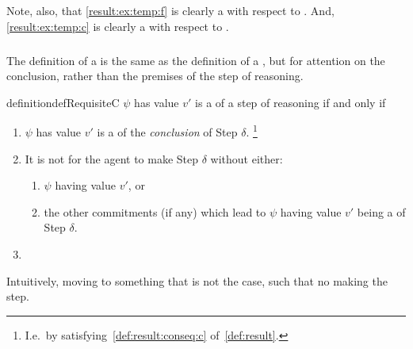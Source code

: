 \begin{note}
  Note, also, that \ref{result:ex:temp:f} is clearly a  with respect to \CStepB{}.
  And, \ref{result:ex:temp:c} is clearly a \prequ{} with respect to \CStepC{}.
\end{note}

\subparagraph{}

\begin{note}
  The definition of a  is the same as the definition of a , but for attention on the conclusion, rather than the premises of the step of reasoning.
\end{note}

\begin{note}
  \begin{restatable}{definition}{defRequisiteC}
    \label{def:crequ}
    \(\psi\) has value \(v'\) is a \emph{} of a step of reasoning if and only if
    \begin{enumerate}[label=\arabic*., ref=\named{cR:\arabic*}]
    \item
      \(\psi\) has value \(v'\) is a  of the \emph{conclusion} of Step \(\delta\).\nolinebreak
      \footnote{
        I.e.\ by satisfying~\ref{def:result:conseq:c} of~\autoref{def:result}.
      }
    \item
      \label{def:crequ:subjunctive}
      It is not \epAdv{} for the agent to make Step \(\delta\) without either:
      \begin{enumerate}[label=\alph*., ref=\named{cR:2\alph*}]
      \item \(\psi\) having value \(v'\), or
      \item the other commitments (if any) which lead to \(\psi\) having value \(v'\) being a  of Step \(\delta\).
      \end{enumerate}
    \item
      \requGlobalClause{}
    \end{enumerate}
    \vspace{-\baselineskip}
  \end{restatable}
\end{note}

\begin{note}
  Intuitively, moving to something that is not the case, such that no making the step.
\end{note}

